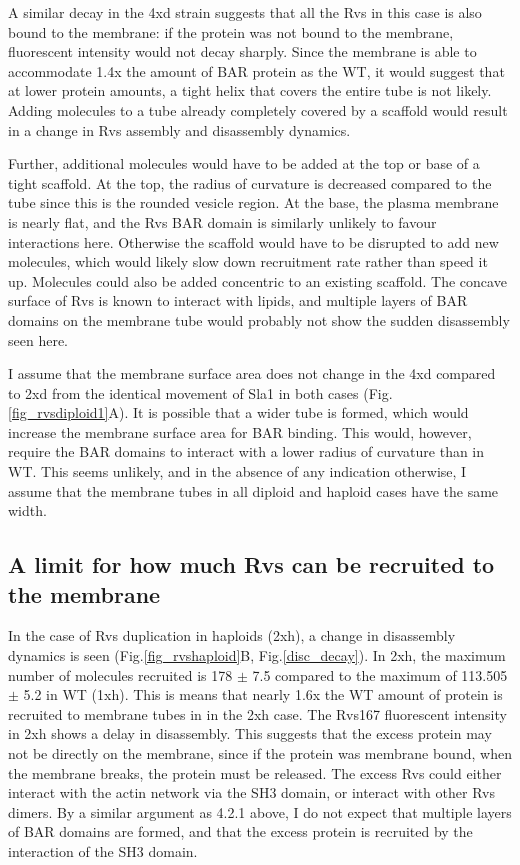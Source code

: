 	\vspace{5mm}
A similar decay in the 4xd strain suggests that all the Rvs in this case is also bound to the membrane: if the protein was not bound to the membrane, fluorescent intensity would not decay sharply. Since the membrane is able to accommodate 1.4x the amount of BAR protein as the WT, it would suggest that at lower protein amounts, a tight helix that covers the entire tube is not likely. Adding molecules to a tube already completely covered by a scaffold would result in a change in Rvs assembly and disassembly dynamics. 

Further, additional molecules would have to be added at the top or base of a tight scaffold. At the top, the radius of curvature is decreased compared to the tube since this is the rounded vesicle region. At the base, the plasma membrane is nearly flat, and the Rvs BAR domain is similarly unlikely to favour interactions here. Otherwise the scaffold would have to be disrupted to add new molecules, which would likely slow down recruitment rate rather than speed it up. Molecules could also be added concentric to an existing scaffold. The concave surface of Rvs is known to interact with lipids, and multiple layers of BAR domains on the membrane tube would probably not show the sudden disassembly seen here.  

I assume that the membrane surface area does not change in the 4xd compared to 2xd from the identical movement of Sla1 in both cases (Fig.\ref{fig_rvsdiploid1}A). It is possible that a wider tube is formed, which would increase the membrane surface area for BAR binding. This would, however, require the BAR domains to interact with a lower radius of curvature than in WT. This seems unlikely, and in the absence of any indication otherwise, I assume that the membrane tubes in all diploid and haploid cases have the same width.


\subsection{A limit for how much Rvs can be recruited to the membrane}
In the case of Rvs duplication in haploids (2xh), a change in disassembly dynamics is seen (Fig.\ref{fig_rvshaploid}B, Fig.\ref{disc_decay}). In 2xh, the maximum number of molecules recruited is 178 $\pm$ 7.5 compared to the maximum of 113.505 $\pm$ 5.2 in WT (1xh). This is means that nearly 1.6x the WT amount of protein is recruited to membrane tubes in in the 2xh case. The Rvs167 fluorescent intensity in 2xh shows a delay in disassembly. This suggests that the excess protein may not be directly on the membrane, since if the protein was membrane bound, when the membrane breaks, the protein must be released. The excess Rvs could either interact with the actin network via the SH3 domain, or interact with other Rvs dimers. By a similar argument as 4.2.1 above, I do not expect that multiple layers of BAR domains are formed, and that the excess protein is recruited by the interaction of the SH3 domain. 


